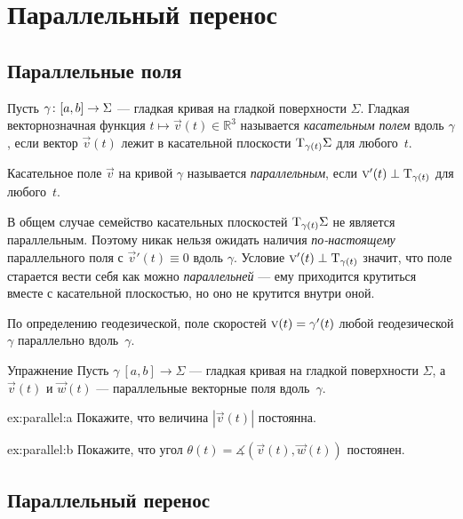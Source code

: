 \chapter{Параллельный перенос}
\label{chap:parallel-transport}

\section{Параллельные поля}

Пусть $\gamma\:[a,b]\z\to \Sigma$ --- гладкая кривая на гладкой поверхности $\Sigma$.
Гладкая векторнозначная функция $t\mapsto {\vec v}(t) \in \mathbb{R}^3$ называется \emph{касательным полем} вдоль $\gamma$, если
вектор ${\vec v}(t)$ лежит в касательной плоскости $\mathrm{T}_{\gamma(t)}\Sigma$ для любого~$t$.

Касательное поле ${\vec v}$ на кривой $\gamma$ называется \emph{параллельным}, если ${\text{\sc{v}}}'(t)\perp\mathrm{T}_{\gamma(t)}$ для любого~$t$.

В общем случае семейство касательных плоскостей $\mathrm{T}_{\gamma(t)}\Sigma$ не является параллельным.
Поэтому никак нельзя ожидать наличия \textit{по-настоящему} параллельного поля с ${\vec v}'(t)\equiv 0$ вдоль $\gamma$.
Условие ${\vec v}'(t)\z\perp\T_{\gamma(t)}$ значит, что поле старается вести себя как можно \textit{параллельней} --- ему приходится крутиться вместе с касательной плоскостью, но оно не крутится внутри оной.

По определению геодезической, поле скоростей ${\vec v}(t)\z=\gamma'(t)$ любой геодезической $\gamma$  параллельно вдоль~$\gamma$.

\begin{thm}{Упражнение}\label{ex:parallel}
Пусть $\gamma\:[a,b]\to \Sigma$ --- гладкая кривая на гладкой поверхности $\Sigma$, а ${\vec v}(t)$ и $\vec w(t)$ --- параллельные векторные поля вдоль~$\gamma$.

\begin{subthm}{ex:parallel:a} Покажите, что величина $|{\vec v}(t)|$ постоянна.
\end{subthm}

\begin{subthm}{ex:parallel:b} Покажите, что угол $\theta(t)=\measuredangle({\vec v}(t),\vec w(t))$ постоянен.
\end{subthm}

\end{thm}


\section{Параллельный перенос}


